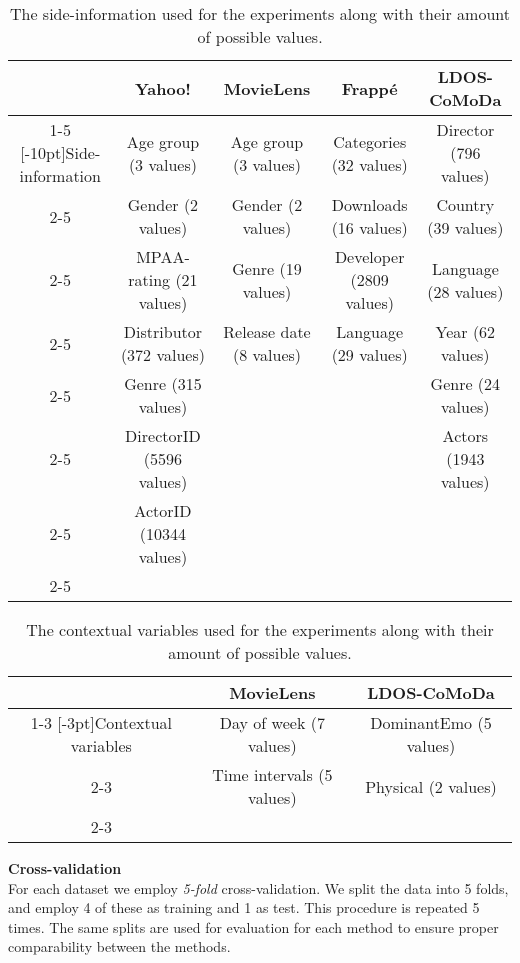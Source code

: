 \begin{table*}[]\centering
    \caption{The side-information used for the experiments along with their amount of possible values.}\label{tbl:sideinfoprotocol}
    \scriptsize
    \begin{tabular}{ccccc}\toprule
         & \textbf{Yahoo!} & \textbf{MovieLens} & \textbf{Frappé} & \textbf{LDOS-CoMoDa}\\\cmidrule{1-5}
         \multirow{8}{*}[-10pt]{Side-information} & Age group (3 values) & Age group (3 values) & Categories (32 values) & Director (796 values)\\\cmidrule{2-5}
         & Gender (2 values) & Gender (2 values) & Downloads (16 values) & Country (39 values) \\\cmidrule{2-5}
         & MPAA-rating (21 values)  &  Genre (19 values) & Developer (2809 values) & Language (28 values)\\\cmidrule{2-5}
         & Distributor (372 values)  & Release date (8 values) & Language (29 values) & Year (62 values)\\\cmidrule{2-5}
         & Genre (315 values)  &  & & Genre (24 values)\\\cmidrule{2-5}
         & DirectorID (5596 values)  &  & & Actors (1943 values) \\\cmidrule{2-5}
         & ActorID (10344 values)  &  & & \\\cmidrule{2-5}
    \bottomrule
    \end{tabular}
\end{table*}
\begin{table*}[]\centering
    \caption{The contextual variables used for the experiments along with their amount of possible values.}\label{tbl:contextprotocol}
    \scriptsize
    \begin{tabular}{ccc}\toprule
         & \textbf{MovieLens} & \textbf{LDOS-CoMoDa}\\\cmidrule{1-3}
         \multirow{2}{*}[-3pt]{Contextual variables} & Day of week (7 values) & DominantEmo (5 values)\\\cmidrule{2-3}
         & Time intervals (5 values) & Physical (2 values) \\\cmidrule{2-3}
    \bottomrule
    \end{tabular}
\end{table*}

\noindent
\textbf{Cross-validation}\\
For each dataset we employ \textit{5-fold} cross-validation.
We split the data into 5 folds, and employ 4 of these as training and 1 as test.
This procedure is repeated 5 times.
The same splits are used for evaluation for each method to ensure proper comparability between the methods.

